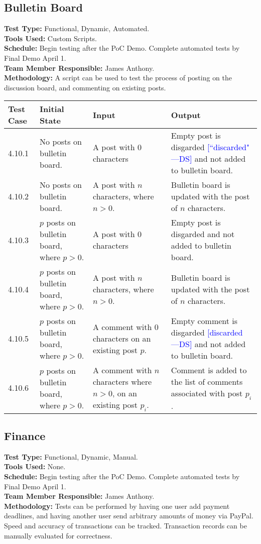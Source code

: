 \documentclass[12pt]{article}
\newcommand{\authornote}[3]{\textcolor{#1}{[#3 ---#2]}}
\newcommand{\authornote}[3]{}
\newcommand{\ds}[1]{\authornote{blue}{DS}{#1}}
\begin{document}
\subsection{Bulletin Board}
\textbf{Test Type:} Functional, Dynamic, Automated. \\
\textbf{Tools Used:} Custom Scripts. \\
\textbf{Schedule:} Begin testing after the PoC Demo. Complete automated tests by Final Demo April 1. \\
\textbf{Team Member Responsible:} James Anthony. \\
\textbf{Methodology:} A script can be used to test the process of posting on the discussion board, and commenting on existing posts.

\begin{longtable}{|p{2cm}|p{3cm}|p{5cm}|p{5cm}|}
\hline
\textbf{Test Case} & \textbf{Initial State} & \textbf{Input} & \textbf{Output} \\ \hline
4.10.1 & No posts on bulletin board. & A post with 0 characters & Empty post is disgarded
\ds{``discarded"}
and not added to bulletin board.\\
\hline
4.10.2 & No posts on bulletin board. & A post with $n$ characters, where $n > 0$. & Bulletin board is updated with the post of $n$ characters.\\
\hline
4.10.3 & $p$ posts on bulletin board, where $p > 0$. & A post with 0 characters & Empty post is disgarded and not added to bulletin board.\\
\hline
4.10.4 & $p$ posts on bulletin board, where $p > 0$. & A post with $n$ characters, where $n > 0$. & Bulletin board is updated with the post of $n$ characters.\\
\hline
4.10.5 & $p$ posts on bulletin board, where $p > 0$. & A comment with 0 characters on an existing post $p$. & Empty comment is disgarded
\ds{discarded}
and not added to bulletin board.\\
\hline
4.10.6 & $p$ posts on bulletin board, where $p > 0$. & A comment with $n$ characters where $n > 0$, on an existing post $p_i$. & Comment is added to the list of comments associated with post $p_i$.\\
\hline
\end{longtable}
  
\subsection{Finance}
\textbf{Test Type:} Functional, Dynamic, Manual. \\
\textbf{Tools Used:} None. \\
\textbf{Schedule:} Begin testing after the PoC Demo. Complete automated tests by Final Demo April 1. \\
\textbf{Team Member Responsible:} James Anthony. \\
\textbf{Methodology:} Tests can be performed by having one user add payment deadlines, and having another user send arbitrary amounts of money via PayPal. Speed and accuracy of transactions can be tracked. Transaction records can be manually evaluated for correctness.
\end{document}
